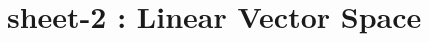 
\chapter{sheet-2 : Linear Vector Space}
\ifpdf
\graphicspath{{Chapter2/figs/}}
\else
\graphicspath{{Chapter2/figs/}}
\fi


%








%	
%
%	
%	
%	

